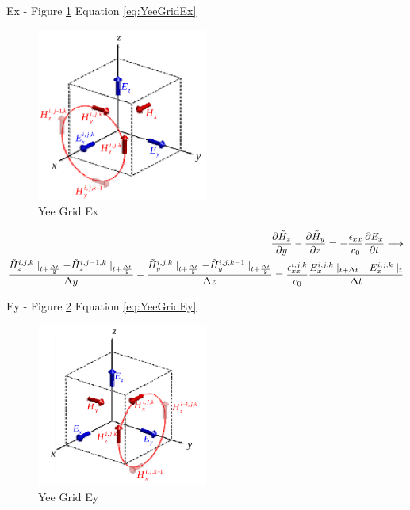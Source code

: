 \documentclass[a4paper,10pt]{article}
\begin{document}
Ex - Figure \ref{fig:YeeGridEx} Equation \eqref{eq:YeeGridEx} 

\begin{figure}[h]
  \centering
    \includegraphics[width=0.5\textwidth]{YeeGridEx.png}
  \caption{Yee Grid Ex}
  \label{fig:YeeGridEx}
\end{figure}

\begin{align}
  \label{eq:YeeGridEx}
  \frac{\partial \tilde{H}_z}{\partial y} - \frac{\partial \tilde{H}_y}{\partial z} = -\frac{\epsilon_{xx}}{c_0}\frac{\partial E_x}{\partial t}
  \longrightarrow\\
  \frac{\tilde{H}_{z}^{i,j,k}\mid_{t+\frac{\Delta t}{2}} - \tilde{H}_{z}^{i,j-1,k}\mid_{t+\frac  {\Delta t}{2}}}{\Delta y} - \frac{\tilde{H}_{y}^{i,j,k}\mid_{t+\frac  {\Delta t}{2}} - \tilde{H}_{y}^{i,j,k-1}\mid_{t+\frac  {\Delta t}{2}}}{\Delta z} = \frac{\epsilon_{xx}^{i,j,k}}{c_0} \frac{E_{x}^{i,j,k}\mid_{t+\Delta t} - E_{x}^{i,j,k}\mid_{t}}{\Delta t}\notag
\end{align}


Ey - Figure \ref{fig:YeeGridEy} Equation \eqref{eq:YeeGridEy} 

\begin{figure}[h]
  \centering
    \includegraphics[width=0.5\textwidth]{YeeGridEy.png}
  \caption{Yee Grid Ey}
  \label{fig:YeeGridEy}
\end{figure}
\end{document}
